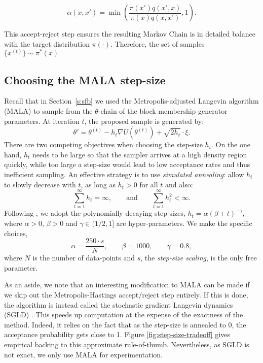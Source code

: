 \begin{equation}
\alpha(x, x') = \min \left( \frac{\pi(x') q(x', x)}{\pi(x) q(x, x')} , 1 \right).
\label{eqn:mh-accept}
\end{equation}

This accept-reject step ensures the resulting Markov Chain is in detailed balance with the target distribution $\pi(\cdot)$. Therefore, the set of samples $\{x^{(t)}\} \sim \pi^*(x)$

\subsection{Choosing the MALA step-size}
\label{appdx:step-size}

Recall that in 
Section~\ref{s:sfb} we used 
the Metropolis-adjusted Langevin algorithm (MALA)
to 
sample from the $\theta$-chain of the block membership 
generator parameters.
At iteration $t$, the proposed sample is generated by:
%
\begin{equation}
	\theta' = \theta^{(t)} - h_t \nabla U(\theta^{(t)}) + \sqrt{2h_t} \cdot \xi.
\end{equation}
%
There are two competing objectives when choosing the step-size $h_t$. 
On the one hand, $h_t$ needs to be large so that the sampler
arrives at a high density region quickly,
while too large a step-size would lead to low acceptance rates and thus 
inefficient sampling. An effective strategy is
to use {\em simulated annealing}: allow $h_t$ to slowly decrease
with $t$, as long as $h_t>0$ for all $t$ and also:
%
\begin{equation}
	\sum_{t=1}^{\infty} h_t = \infty, \qquad \textrm{and} \qquad
	\sum_{t=1}^{\infty} h_t^2 < \infty.
	\label{eqn:h-constraints}
\end{equation}
%
Following \citet{Bayesian-SGLD}, we adopt the 
polynomially decaying step-sizes,
%
$h_t = \alpha(\beta + t)^{-\gamma}$,
%
where $\alpha>0$, $\beta>0$ and $\gamma\in(1/2,1]$ are hyper-parameters.
We make the specific choices,
%
\begin{equation}
	\alpha = \frac{250 \cdot s}{N}, \qquad \beta = 1000, \qquad \gamma = 0.8,
	\label{eqn:step-size-params}
\end{equation}
%
where $N$ is the number of data-points and $s$,
the {\em step-size scaling}, is the only free parameter.

As an aside, we note that an interesting modification to MALA can be made if we skip out the Metropolis-Hastings accept/reject step entirely. If this is done, the algorithm is instead called the stochastic gradient Langevin dynamics (SGLD) \cite{Bayesian-SGLD}. This speeds up computation at the expense of the exactness of the method. Indeed, it relies on the fact that as the step-size is annealed to 0, the acceptance probability gets close to 1. Figure \ref{fig:step-size-tradeoff} gives empirical backing to this approximate rule-of-thumb. Nevertheless, as SGLD is not exact, we only use MALA for experimentation.

